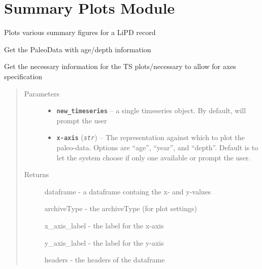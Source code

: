 \documentclass[letterpaper,10pt,english]{sphinxmanual}
\begin{document}
\chapter{Summary Plots Module}
\label{SummaryPlots::doc}\label{SummaryPlots:summary-plots-module}

\begin{fulllineitems}
\label{SummaryPlots:pyleoclim.SummaryPlots}
Plots various summary figures for a LiPD record

\begin{fulllineitems}
\label{SummaryPlots:pyleoclim.SummaryPlots.TSdata}
Get the PaleoData with age/depth information

Get the necessary information for the TS plots/necessary to allow for
axes specification
\begin{quote}\begin{description}
\item[{Parameters}] \leavevmode\begin{itemize}
\item {} 
\textbf{\texttt{new\_timeseries}} -- a single timeseries object.
By default, will prompt the user

\item {} 
\textbf{\texttt{x-axis}} (\emph{\texttt{str}}) -- The representation against which to plot the
paleo-data. Options are ``age'', ``year'', and ``depth''.
Default is to let the system choose if only one available
or prompt the user.

\end{itemize}

\item[{Returns}] \leavevmode

dataframe - a dataframe containg the x- and y-values

archiveType - the archiveType (for plot settings)

x\_axis\_label - the label for the x-axis

y\_axis\_label - the label for the y-axis

headers - the headers of the dataframe


\end{description}\end{quote}


\end{fulllineitems}
\end{fulllineitems}
\end{document}
